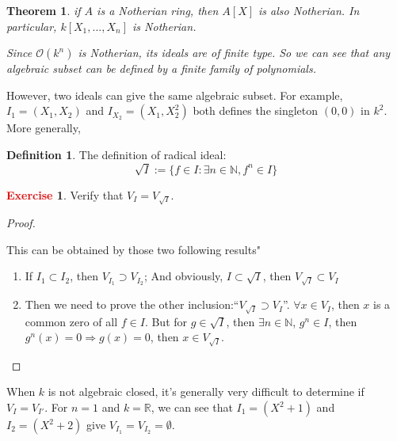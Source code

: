 \documentclass[12pt,a4paper,english]{article}
\theoremstyle{plain}
\newtheorem{thm}{Theorem}[section]
\theoremstyle{definition}
\newtheorem{defi}{Definition}
\newtheorem{exercise}{\textbf{\textcolor{red}{Exercise}}}
\theoremstyle{remark}
\begin{document}
\begin{thm}
if $A$ is a Notherian ring, then $A[X]$ is also Notherian. In particular, $k[X_{1},...,X_{n}]$ is Notherian. 

Since $\mathcal{O}(k^{n})$ is Notherian, its ideals are of finite type. So we can see that any algebraic subset can be defined by a finite family of polynomials.
\end{thm}
However, two ideals can give the same algebraic subset. For example, $I_{1}=(X_{1},X_{2})$ and $I_{X_{2}}=(X_{1},X_{2}^{2})$ both defines the singleton $(0,0)$ in $k^{2}$.
More generally,
\begin{defi}
The definition of radical ideal:
\begin{equation*}
    \sqrt{I}:=\{f\in I:\exists n\in\mathbb{N},f^{n}\in I\}
\end{equation*}
\end{defi}
\begin{exercise}
Verify that $V_{I}=V_{\sqrt{I}}$.
\end{exercise}
\begin{proof}
\begin{tcolorbox}
This can be obtained by those two following results"
\begin{enumerate}
    \item If $I_{1}\subset I_{2}$, then $V_{I_{1}}\supset V_{I_{2}}$; And obviously, $I\subset\sqrt{I}$, then $V_{\sqrt{I}}\subset V_{I}$
    \item Then we need to prove the other inclusion:“$V_{\sqrt{I}}\supset V_{I}$”. $\forall x\in V_{I}$, then $x$ is a common zero of all $f\in I$. But for $g\in\sqrt{I}$, then $\exists n\in\mathbb{N}$, $g^{n}\in I$, then $g^{n}(x)=0\Rightarrow g(x)=0$, then $x\in V_{\sqrt{I}}$.
\end{enumerate}
\end{tcolorbox}
\end{proof}
When $k$ is not algebraic closed, it's generally very difficult to determine if $V_{I}=V_{I'}$. For $n=1$ and $k=\mathbb{R}$, we can see that $I_{1}=(X^{2}+1)$ and $I_{2}=(X^{2}+2)$ give $V_{I_{1}}=V_{I_{2}}=\emptyset$.
\end{document}

